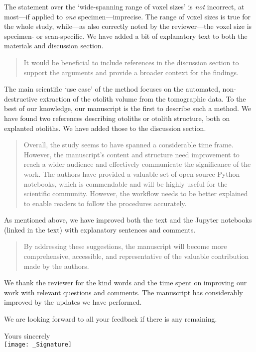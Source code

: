 \documentclass[color,english,personal]{ubletter}
\begin{document}
\begin{letter}{}
The statement over the `wide-spanning range of voxel sizes' is
\emph{not} incorrect, at most---if applied to \emph{one}
specimen---imprecise. The range of voxel sizes is true for the whole
study, while---as also correctly noted by the reviewer---the voxel size
is specimen- or scan-specific. We have added a bit of explanatory text
to both the materials and discussion section.

\begin{quote}
It would be beneficial to include references in the discussion section
to support the arguments and provide a broader context for the findings.
\end{quote}

The main scientific `use case' of the method focuses on the automated,
non-destructive extraction of the otolith volume from the tomographic
data. To the best of our knowledge, our manuscript is the first to
describe such a method. We have found two references describing otoliths
or otolith structure, both on explanted otoliths. We have added those to
the discussion section.

\begin{quote}
Overall, the study seems to have spanned a considerable time frame.
However, the manuscript's content and structure need improvement to
reach a wider audience and effectively communicate the significance of
the work. The authors have provided a valuable set of open-source Python
notebooks, which is commendable and will be highly useful for the
scientific community. However, the workflow needs to be better explained
to enable readers to follow the procedures accurately.
\end{quote}

As mentioned above, we have improved both the text and the Jupyter
notebooks (linked in the text) with explanatory sentences and comments.

\begin{quote}
By addressing these suggestions, the manuscript will become more
comprehensive, accessible, and representative of the valuable
contribution made by the authors.
\end{quote}

We thank the reviewer for the kind words and the time spent on improving
our work with relevant questions and comments. The manuscript has
considerably improved by the updates we have performed.

We are looking forward to all your feedback if there is any remaining.

\addtolength{\medskipamount}{-\medskipamount} %
\closing{Yours sincerely\\\texttt{[image: \_Signature]}}
\end{letter}
\end{document}
